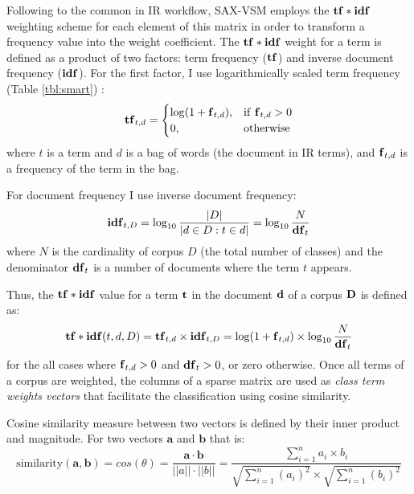 Following to the common in IR workflow, SAX-VSM employs the $\text{\textbf{tf}}\ast\text{\textbf{idf}}$ weighting scheme 
\cite{citeulike:4469058} for each element of this matrix in order to transform a frequency value into the 
weight coefficient. 
The $\text{\textbf{tf}}\ast\text{\textbf{idf}}$ weight for a term is defined as a product of two factors: term frequency ($\text{\textbf{tf}}$) 
and inverse document frequency ($\text{\textbf{idf}}$). 
For the first factor, I use logarithmically scaled term frequency (Table \ref{tbl:smart}) \cite{citeulike:4469058}:
\begin{equation}
 \mbox{\textbf{tf}}_{t, d} =  \begin{cases} \log(1 + \mbox{\textbf{f}}_{t,d}), &\mbox{if \textbf{f}}_{t,d}>0  \\
0, & \mbox{otherwise} \end{cases}
\end{equation} 
where $t$ is a term and $d$ is a bag of words (the document in IR terms), and $\mbox{\textbf{f}}_{t,d}$ 
is a frequency of the term in the bag.

For document frequency I use inverse document frequency:
\begin{equation}
 \mbox{\textbf{idf}}_{t, D} =  \log_{10}\frac{|D|}{|d \in D : t \in d|} = \log_{10}\frac{N}{\mbox{\textbf{df}}_{t}}
 \label{formula:idf}
\end{equation} 
where $N$ is the cardinality of corpus $D$ (the total number of classes) and the 
denominator $\mbox{\textbf{df}}_{t}$ is a number of documents where the term $t$ appears.

Thus, the $\text{\textbf{tf}} \ast \text{\textbf{idf}}$ value for a term $\text{\textbf{t}}$ in the document 
$\text{\textbf{d}}$ of a corpus $\text{\textbf{D}}$ is defined as:
\begin{equation}
 \text{\textbf{tf}} \ast \text{\textbf{idf}}(t, d, D) =  \text{\textbf{tf}}_{t, d} \times \text{\textbf{idf}}_{t, D} = \log(1 + \text{\textbf{f}}_{t,d})
\times \log_{10}\frac{N}{\mbox{\textbf{df}}_{t}}
 \label{formula:tfidf}
\end{equation} 
for the all cases where $\mbox{\textbf{f}}_{t,d}>0$ and $\mbox{\textbf{df}}_{t}>0$, or zero otherwise.
Once all terms of a corpus are weighted, the columns of a sparse matrix are used 
as \textit{class term weights vectors} that facilitate the classification using cosine similarity. 

Cosine similarity measure between two vectors is defined by their inner product and magnitude. 
For two vectors $\mathbf{a}$ and $\mathbf{b}$ that is:
\begin{equation}
\mbox{similarity}(\mathbf{a},\mathbf{b}) = cos(\theta) = 
\frac{ \mathbf{a} \cdot \mathbf{b} } {\left| \left| a \right| \right| \cdot \left| \left| b \right|\right|} =
\frac{ \sum\limits_{i=1}^{n}{a_{i} \times b_{i}} }{ \sqrt{\sum\limits_{i=1}^{n}{(a_{i})^2}} \times \sqrt{\sum\limits_{i=1}^{n}{(b_{i})^2}}}
\end{equation} 

